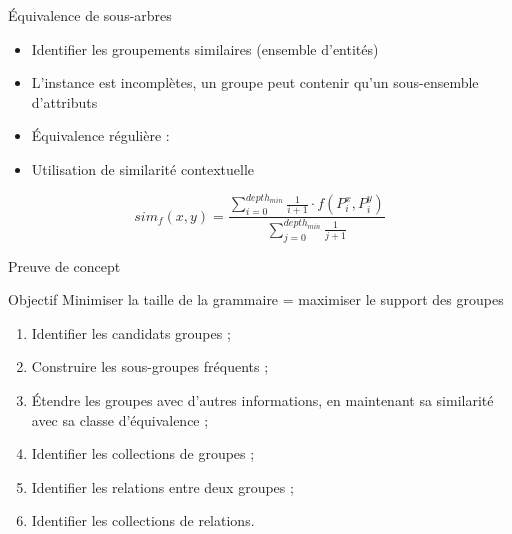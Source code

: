 \begin{frame}{Équivalence de sous-arbres}
    \begin{itemize}
        \item Identifier les groupements similaires (ensemble d'entités)
        \item L'instance est incomplètes, un groupe peut contenir qu'un sous-ensemble d'attributs
        \pause
        \item Équivalence régulière : 
        \pause
        \item Utilisation de similarité contextuelle
    \end{itemize}

    \vfill

    \begin{equation*}
        sim_f(x, y) = \frac{\sum_{i=0}^{depth_{min}} \frac{1}{i + 1} \cdot f(P^x_i, P^y_i)}{\sum_{j=0}^{depth_{min}} \frac{1}{j + 1}} \label{eq:struct:sim}
    \end{equation*}
\end{frame}

\begin{frame}{Preuve de concept}
    \begin{block}{Objectif}
        Minimiser la taille de la grammaire \pause= maximiser le support des groupes
    \end{block}

    \vfill
    \pause

    \begin{enumerate}
        \item Identifier les candidats groupes ;
        \item Construire les sous-groupes fréquents ;
        \item Étendre les groupes avec d'autres informations, en maintenant sa similarité avec sa classe d'équivalence ;
        \item Identifier les collections de groupes ;
        \item Identifier les relations entre deux groupes ;
        \item Identifier les collections de relations.
    \end{enumerate}
\end{frame}

